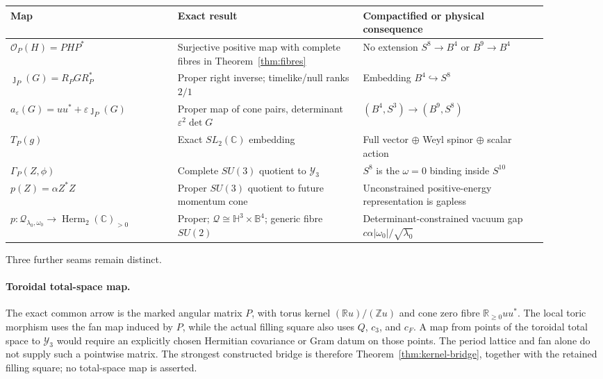 \documentclass[11pt]{article}
\theoremstyle{definition}
\newcommand{\C}{\mathbb C}
\newcommand{\R}{\mathbb R}
\newcommand{\Z}{\mathbb Z}
\newcommand{\Herm}{\operatorname{Herm}}
\newcommand{\Y}{\mathcal Y_3}
\newcommand{\cQ}{\mathscr Q}
\begin{document}
\begin{center}
\begin{tabular}{>{\raggedright\arraybackslash}p{0.28\linewidth}>{\raggedright\arraybackslash}p{0.31\linewidth}>{\raggedright\arraybackslash}p{0.31\linewidth}}
\toprule
Map & Exact result & Compactified or physical consequence\\
\midrule
$\mathcal O_P(H)=PHP^*$ & Surjective positive map with complete fibres in Theorem~\ref{thm:fibres} & No extension $S^8\to B^4$ or $B^9\to B^4$\\
$\jmath_P(G)=R_PGR_P^*$ & Proper right inverse; timelike/null ranks $2/1$ & Embedding $B^4\hookrightarrow S^8$\\
$a_\varepsilon(G)=uu^*+\varepsilon\jmath_P(G)$ & Proper map of cone pairs, determinant $\varepsilon^2\det G$ & $(B^4,S^3)\to(B^9,S^8)$\\
$T_P(g)$ & Exact $SL_2(\C)$ embedding & Full vector $\oplus$ Weyl spinor $\oplus$ scalar action\\
$\Gamma_P(Z,\phi)$ & Complete $SU(3)$ quotient to $\Y$ & $S^8$ is the $\omega=0$ binding inside $S^{10}$\\
$p(Z)=\alpha Z^*Z$ & Proper $SU(3)$ quotient to future momentum cone & Unconstrained positive-energy representation is gapless\\
$p:\cQ_{\lambda_0,\omega_0}\to\Herm_2(\C)_{>0}$ & Proper; $\cQ\cong\mathbb H^3\times\mathbb B^4$; generic fibre $SU(2)$ & Determinant-constrained vacuum gap $c\alpha|\omega_0|/\sqrt{\lambda_0}$\\
\bottomrule
\end{tabular}
\end{center}

Three further seams remain distinct.

\paragraph{Toroidal total-space map.}
The exact common arrow is the marked angular matrix $P$, with torus kernel $(\R u)/(\Z u)$ and cone zero fibre $\R_{\geq0}uu^*$.  The local toric morphism uses the fan map induced by $P$, while the actual filling square also uses $Q$, $c_3$, and $c_F$.  A map from points of the toroidal total space to $\Y$ would require an explicitly chosen Hermitian covariance or Gram datum on those points.  The period lattice and fan alone do not supply such a pointwise matrix.  The strongest constructed bridge is therefore Theorem~\ref{thm:kernel-bridge}, together with the retained filling square; no total-space map is asserted.
\end{document}
